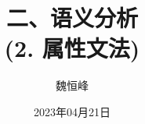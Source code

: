 \documentclass[]{beamer}
\title[语义分析]{二、语义分析 \\ (2. 属性文法)}
\author[魏恒峰]{\large 魏恒峰}
\institute{hfwei@nju.edu.cn}
\date{2023年04月21日}
\begin{document}
\maketitle




\thankyou{}

\end{document}
